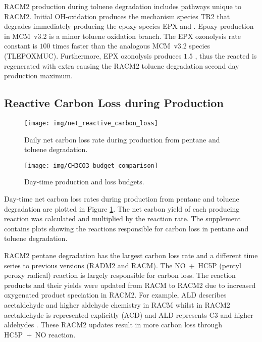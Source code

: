 RACM2  production during toluene degradation includes pathways unique to RACM2.
Initial OH-oxidation produces the mechanism species TR2 that degrades immediately producing the epoxy species EPX and .
Epoxy production in \mbox{MCM v3.2} is a minor toluene oxidation branch.
The EPX ozonolysis rate constant is $100$ times faster than the analogous \mbox{MCM v3.2} species (TLEPOXMUC).
Furthermore, EPX ozonolysis produces $1.5$ , thus the reacted  is regenerated with extra  causing the RACM2 toluene degradation second day  production maximum.

\subsection[Reactive Carbon Loss during Ox Production]{Reactive Carbon Loss during  Production} \label{ss:carbon_loss}

\begin{figure}
    \centering
    \texttt{[image: img/net\_reactive\_carbon\_loss]}
    \vspace{0mm}
    \caption{Daily net carbon loss rate during  production from pentane and toluene degradation.}
    \vspace{-4mm}
    \label{f:net_carbon_loss}
\end{figure}

\begin{figure}
    \centering
    \texttt{[image: img/CH3CO3\_budget\_comparison]}
    \vspace{0mm}
    \caption{Day-time  production and loss budgets.}
    \vspace{-4mm}
    \label{f:CH3CO3_budget}
\end{figure}

Day-time net carbon loss rates during  production from pentane and toluene degradation are plotted in Figure \ref{f:net_carbon_loss}.
The net carbon yield of each  producing reaction was calculated and multiplied by the reaction rate.
The supplement contains plots showing the reactions responsible for carbon loss in pentane and toluene degradation.

RACM2 pentane degradation has the largest carbon loss rate and a different time series to previous versions (RADM2 and RACM).  
The \mbox{NO + HC5P} (pentyl peroxy radical) reaction is largely responsible for carbon loss.
The reaction products and their yields were updated from RACM to RACM2 due to increased oxygenated product speciation in RACM2.
For example, ALD describes acetaldehyde and higher aldehyde chemistry in RACM whilst in RACM2 acetaldehyde is represented explicitly (ACD) and ALD represents C3 and higher aldehydes \citep{Goliff:2013}.
These RACM2 updates result in more carbon loss through \mbox{HC5P + NO} reaction.

